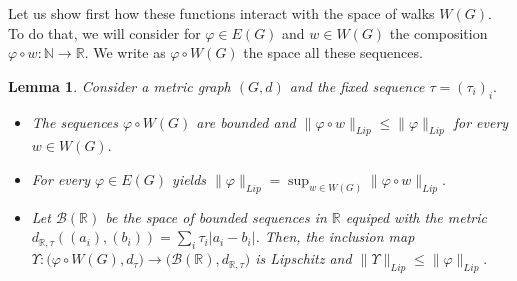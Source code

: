 \documentclass[preprint,12pt]{elsarticle}
\newtheorem{lemma}[theorem]{Lemma}
\begin{document}
Let us show first how these functions interact with the space of walks $W(G)$. To do that, we will consider for $\varphi \in E(G)$ and $w \in W( G)$ the composition $\varphi \circ w: \mathbb N \to \mathbb R.$ We write as $\varphi \circ W(G)$ the space all these sequences.
\begin{lemma} \label{1dual}
Consider a metric graph $(G,d)$ and the fixed sequence $\tau=(\tau_i)_i.$

\begin{itemize}
\item[(i)] The sequences $\varphi \circ W(G)$ are bounded and $\|\varphi \circ w\|_{Lip} \le \|\varphi\|_{Lip}$ for every $w \in W(G).$

\item[(ii)] For every $\varphi \in E(G)$ yields
$
\|\varphi\|_{Lip}= \sup_{w \in W(G)} \|\varphi \circ w\|_{Lip}.
$


\item[(iii)] Let $\mathcal{B}(\mathbb R)$ be the space of bounded sequences in $\mathbb R$ equiped with the metric $d_{\mathbb R,\tau}((a_i),(b_i))=\sum_i\tau_i|a_i-b_i|$. Then, the inclusion map  $\Upsilon: \big( \varphi \circ W(G), d_\tau \big) \to \big( \mathcal B(\mathbb R), d_{\mathbb R,\tau} \big)$ is  Lipschitz and $\|\Upsilon\|_{Lip} \le \|\varphi\|_{Lip}.$


\end{itemize}

\end{lemma}
\end{document}

